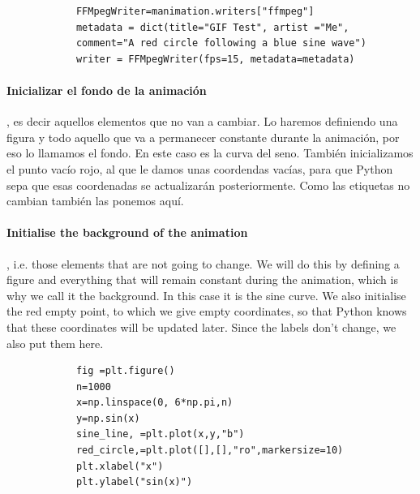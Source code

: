         \begin{verbatim}
            FFMpegWriter=manimation.writers["ffmpeg"]
            metadata = dict(title="GIF Test", artist ="Me", 
            comment="A red circle following a blue sine wave")
            writer = FFMpegWriter(fps=15, metadata=metadata)
        \end{verbatim}
\begin{paracol}{2}
    \paragraph{Inicializar el fondo de la animación}, es decir aquellos elementos que no van a cambiar. Lo haremos definiendo una figura y todo aquello que va a permanecer constante durante la animación, por eso lo llamamos el fondo. En este caso es la curva del seno. También inicializamos el punto vacío rojo, al que le damos unas coordendas vacías, para que Python sepa que esas coordenadas se actualizarán posteriormente. Como las etiquetas no cambian también las ponemos aquí.
    
    \switchcolumn
    
    \paragraph{Initialise the background of the animation},  i.e. those elements that are not going to change. We will do this by defining a figure and everything that will remain constant during the animation, which is why we call it the background. In this case it is the sine curve. We also initialise the red empty point, to which we give empty coordinates, so that Python knows that these coordinates will be updated later. Since the labels don't change, we also put them here.
\end{paracol}

\begin{verbatim}
            fig =plt.figure()
            n=1000
            x=np.linspace(0, 6*np.pi,n)
            y=np.sin(x)
            sine_line, =plt.plot(x,y,"b")
            red_circle,=plt.plot([],[],"ro",markersize=10)
            plt.xlabel("x")
            plt.ylabel("sin(x)")
            
        \end{verbatim}

